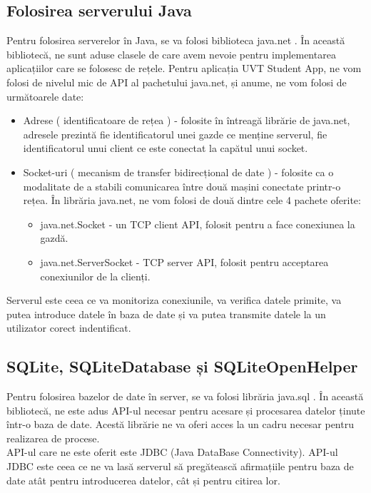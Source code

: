 \documentclass{article}
\begin{document}
		\subsection {Folosirea serverului Java}
		\vspace{0.3cm}
		Pentru folosirea serverelor în Java, se va folosi biblioteca java.net . În această bibliotecă, ne sunt aduse clasele de care avem nevoie pentru implementarea aplicațiilor care se folosesc de rețele. Pentru aplicația UVT Student App, ne vom folosi de nivelul mic de API al pachetului java.net, și anume, ne vom folosi de următoarele date:
		\begin{itemize}
			\item Adrese ( identificatoare de rețea ) - folosite în întreagă librărie de java.net, adresele prezintă fie identificatorul unei gazde ce menține serverul, fie identificatorul unui client ce este conectat la capătul unui socket. 
			\item Socket-uri ( mecanism de transfer bidirecțional de date ) - folosite ca o modalitate de a stabili comunicarea între două mașini conectate printr-o rețea. În librăria java.net, ne vom folosi de două dintre cele 4 pachete oferite:
			\begin{itemize}
				\item java.net.Socket - un TCP client API, folosit pentru a face conexiunea la gazdă.
				\item java.net.ServerSocket - TCP server API, folosit pentru acceptarea conexiunilor de la clienți.
			\end{itemize}
		\end{itemize}
		Serverul este ceea ce va monitoriza conexiunile, va verifica datele primite, va putea introduce datele în baza de date și va putea transmite datele la un utilizator corect indentificat.

		\subsection {SQLite, SQLiteDatabase și SQLiteOpenHelper}
		\vspace{0.3cm}
		Pentru folosirea bazelor de date în server, se va folosi librăria java.sql . În această bibliotecă, ne este adus API-ul necesar pentru acesare și procesarea datelor ținute într-o baza de date. Acestă librărie ne va oferi acces la un cadru necesar pentru realizarea de procese.\\
		API-ul care ne este oferit este JDBC (Java DataBase Connectivity). API-ul JDBC este ceea ce ne va lasă serverul să pregătească afirmațiile pentru baza de date atât pentru introducerea datelor, cât și pentru citirea lor. \\
\end{document}
